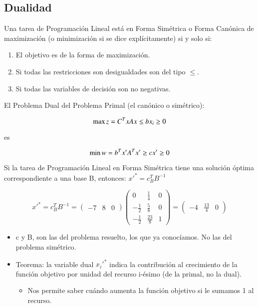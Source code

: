 \documentclass[12pt, twoside, openright]{report} %
\begin{document}
\subsection{Dualidad}

Una tarea de Programación Lineal está en Forma Simétrica o Forma
Canónica de maximización (o minimización si se dice explícitamente) si
y solo si:

\begin{enumerate}
	\item El objetivo es de la forma de maximización.
	\item Si todas las restricciones son desigualdades son del tipo $\leq$.
	\item Si todas las variables de decisión son no negativas.
\end{enumerate}

El Problema Dual del Problema Primal (el canónico o simétrico):

\begin{minipage}{.5\linewidth}
	$$\max z = C^{T}x \\
		Ax\leq b \\
		x_{i} \geq 0$$
\end{minipage}
es
\begin{minipage}{.5\linewidth}
	$$\min w = b^{T}x' \\
		A^Tx' \geq c \\
		x' \geq 0$$
\end{minipage}

Si la tarea de Programación Lineal en Forma Simétrica tiene una
solución óptima correspondiente a una base B, entonces:
\(x'^*= c_B^TB^{-1}\)

$$x'^*=c^T_BB^{-1}=\left( \begin{matrix} -7 & 8 & 0 \end{matrix} \right) \left( \begin{matrix} 0 & \frac 1 4 & 0 \\ - \frac 1 2 & \frac 5 8 & 0 \\ - \frac 1 2 & \frac {23} 8 & 1 \end{matrix} \right) = \left( \begin{matrix} -4 & \frac {13} 4 & 0 \end{matrix} \right)$$

\begin{itemize}
	\item c y B, son las del problema resuelto, los que ya conocíamos. No las
	      del problema simétrico.
	\item Teorema: la variable dual \(x_i'^*\) indica la contribución al
	      crecimiento de la función objetivo por unidad del recurso i-ésimo
	      (de la primal, no la dual).
	      \begin{itemize}
		      \item Nos permite saber cuándo aumenta la función objetivo si le sumamos
		            1 al recurso.
	      \end{itemize}

\end{itemize}
\end{document}
